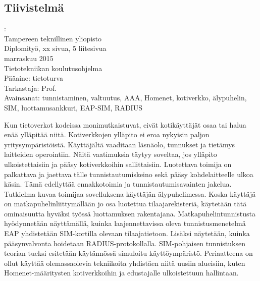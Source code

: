 \documentclass[12pt,a4paper,english]{tutthesis}
\begin{document}
\begin{otherlanguage}{finnish} %
\chapter*{Tiivistelmä}         %

\begin{spacing}{1.0}
         {\bf \textsf{\MakeUppercase{\@author}}}: \@titleB\\  %
         \textsf{Tampereen teknillinen yliopisto}\\
         \textsf{Diplomityö, xx sivua, 5 liitesivua}\\ %
         \textsf{marraskuu 2015}\\
         \textsf{Tietotekniikan koulutusohjelma}\\
         \textsf{Pääaine: tietoturva}\\
         \textsf{Tarkastaja:  Prof. \@examiner}\\ %
         \textsf{Avainsanat: tunnistaminen, valtuutus, AAA, Homenet, kotiverkko, älypuhelin, SIM, luottamusankkuri, EAP-SIM, RADIUS}\\
\end{spacing}
Kun tietoverkot kodeissa monimutkaistuvat, eivät kotikäyttäjät osaa tai halua enää ylläpitää niitä. Kotiverkkojen ylläpito ei  eroa nykyisin paljon yritysympäristöistä. Käyttäjältä vaaditaan läsnäolo, tunnukset ja tietämys laitteiden operointiin. Näitä vaatimuksia
täytyy soveltaa, jos ylläpito ulkoistettaisiin ja pääsy kotiverkkoihin sallittaisiin.
Luotettava toimija on palkattava ja jaettava tälle
tunnistautumiskeino sekä pääsy kohdelaitteelle ulkoa käsin. Tämä edellyttää ennakkotoimia ja tunnistautumisavainten jakelua.
Tutkielma kuvaa toimijaa sovelluksena käyttäjän älypuhelimessa.
Koska käyttäjä on matkapuhelinliittymällään jo osa luotettua
tilaajarekisteriä, käytetään tätä ominaisuutta hyväksi työssä luottamuksen rakentajana.
Matkapuhelintunnistusta hyödynnetään näyttämällä, kuinka
laajennettavissa oleva tunnistusmenetelmä EAP yhdistetään SIM-kortilla olevaan tilaajatietoon. Lisäksi näytetään, kuinka pääsynvalvonta hoidetaan RADIUS-protokollalla.
SIM-pohjaisen tunnistuksen teorian tueksi esitetään käytännössä simuloitu käyttöympäristö. 
Periaatteena on ollut käyttää olemassaolevia tekniikoita yhdistäen niitä uusiin alueisiin, kuten Homenet-määritysten kotiverkkoihin ja edustajalle ulkoistettuun hallintaan.

\end{otherlanguage}
\end{document}
